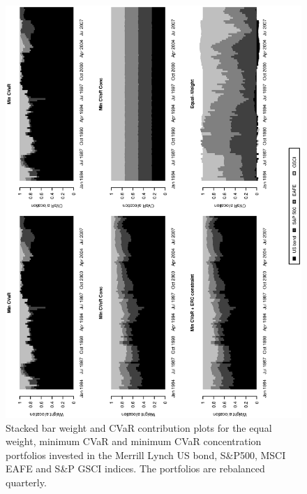 \documentclass[11pt]{article}
\begin{document}
\begin{figure}[tb]
\begin{center}
\caption{Stacked bar weight and CVaR contribution plots for the equal weight, minimum CVaR and minimum CVaR concentration portfolios invested in the Merrill Lynch US bond, S\&P500, MSCI EAFE and S\&P GSCI indices. The portfolios are rebalanced quarterly.}
\includegraphics[width=12cm,angle=270]{stackedweightsriskcont_benchmark.eps}
\end{center}
\end{figure}

\newpage
\end{document}
